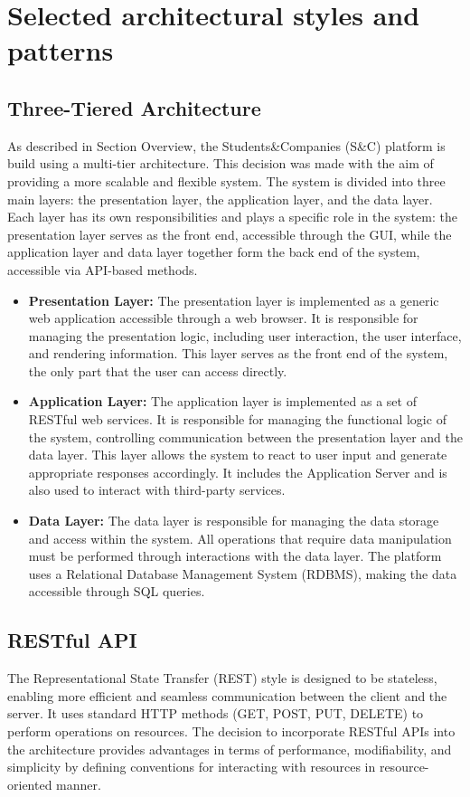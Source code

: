 \section{Selected architectural styles and patterns}\label{sec:selected architectural styles and patterns}
\subsection{Three-Tiered Architecture}\label{subsec:three-tiered architecture}
As described in Section Overview, the Students\&Companies (S\&C) platform is build using a multi-tier architecture. This decision was made with the aim of 
providing a more scalable and flexible system.
The system is divided into three main layers: the presentation layer, the application layer, and the data layer.
Each layer has its own responsibilities and plays a specific role in the system: the presentation layer serves as the front end, accessible through the GUI, 
while the application layer and data layer together form the back end of the system, accessible via API-based methods.
\begin{itemize}
    \item \textbf{Presentation Layer:} The presentation layer is implemented as a generic web application accessible through a web browser.
    It is responsible for managing the presentation logic, including user interaction, the user interface, and rendering information.
    This layer serves as the front end of the system, the only part that the user can access directly.
    \item \textbf{Application Layer:} The application layer is implemented as a set of RESTful web services.
    It is responsible for managing the functional logic of the system, controlling communication between the presentation layer and the data layer.
    This layer allows the system to react to user input and generate appropriate responses accordingly.
    It includes the Application Server and is also used to interact with third-party services.
    \item \textbf{Data Layer:} The data layer is responsible for managing the data storage and access within the system.
    All operations that require data manipulation must be performed through interactions with the data layer.
    The platform uses a Relational Database Management System (RDBMS), making the data accessible through SQL queries.
\end{itemize}
\subsection{RESTful API}\label{subsec:restful api}
The Representational State Transfer (REST) style is designed to be stateless, enabling more efficient and seamless communication between the client and the 
server. It uses standard HTTP methods (GET, POST, PUT, DELETE) to perform operations on resources.
The decision to incorporate RESTful APIs into the architecture provides advantages in terms of performance, modifiability, and simplicity by defining conventions 
for interacting with resources in resource-oriented manner.
